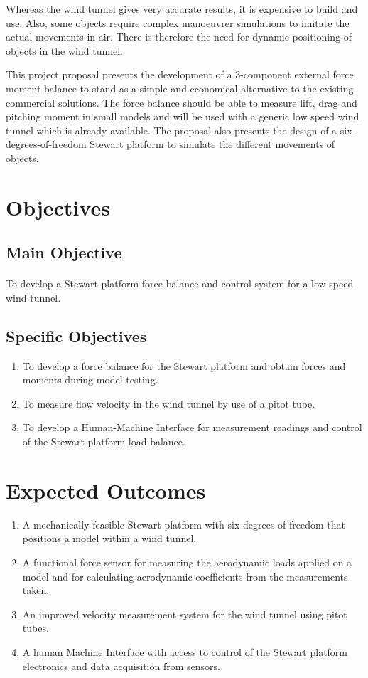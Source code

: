 Whereas the wind tunnel gives very accurate results, it is expensive to build and use. Also, some objects require complex manoeuvrer simulations to imitate the actual movements in air. There is therefore the need for dynamic positioning of objects in the wind tunnel.

This project proposal presents the development of a 3-component external force moment-balance to stand as a simple and economical alternative to the existing commercial solutions. The force balance should be able to measure lift, drag and pitching moment in small models and will be used with a generic low speed wind tunnel which is already available. The proposal also presents the design of a six-degrees-of-freedom Stewart platform to simulate the different movements of objects.
\section{Objectives}
\subsection{Main Objective}
\paragraph{} To develop a Stewart platform force balance and control system for a low speed wind tunnel. 
\subsection{Specific Objectives}
\begin{enumerate}
\item To develop a force balance for the Stewart platform and obtain forces and moments during model testing.
\item To measure flow velocity in the wind tunnel by use of a pitot tube.
\item To develop a Human-Machine Interface for measurement readings and control of the Stewart platform load balance.
\end{enumerate}
\section{Expected Outcomes}
\begin{enumerate}
\item A mechanically feasible Stewart platform with six degrees of freedom that positions a model
within a wind tunnel.
\item A functional force sensor for measuring the aerodynamic loads applied on a model
and for calculating aerodynamic coefficients from the measurements taken.
\item An improved velocity measurement system for the wind tunnel using pitot tubes.
\item A human Machine Interface with access to control of the Stewart platform electronics
and data acquisition from sensors.
\end{enumerate}
